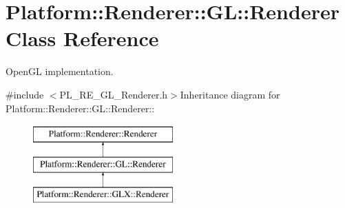 \hypertarget{classPlatform_1_1Renderer_1_1GL_1_1Renderer}{
\section{Platform::Renderer::GL::Renderer Class Reference}
\label{classPlatform_1_1Renderer_1_1GL_1_1Renderer}
}


OpenGL implementation.  


{\ttfamily \#include $<$PL\_\-RE\_\-GL\_\-Renderer.h$>$}Inheritance diagram for Platform::Renderer::GL::Renderer::\begin{figure}[H]
\begin{center}
\leavevmode
\includegraphics[height=3cm]{classPlatform_1_1Renderer_1_1GL_1_1Renderer}
\end{center}
\end{figure}
